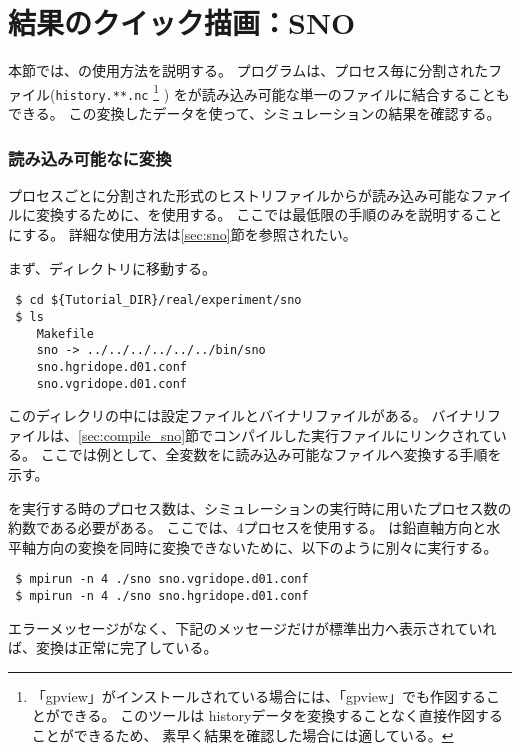 \section{結果のクイック描画：SNO} \label{sec:quicklook}

本節では、\sno の使用方法を説明する。
プログラム\sno は、プロセス毎に分割された{\netcdf}ファイル(\verb|history.**.nc|
\footnote{「gpview」がインストールされている場合には、「gpview」でも作図することができる。
このツールは historyデータを変換することなく直接作図することができるため、
素早く結果を確認した場合には適している。
}
)
を{\grads}が読み込み可能な単一の{\netcdf}ファイルに結合することもできる。
この変換した{\netcdf}データを使って、シミュレーションの結果を確認する。


\subsubsection{{\grads}読み込み可能な{\netcdf}に変換}
プロセスごとに分割された{\netcdf}形式のヒストリファイルから{\grads}が読み込み可能な{\netcdf}ファイルに変換するために、\sno を使用する。
ここでは最低限の手順のみを説明することにする。
詳細な使用方法は\ref{sec:sno}節を参照されたい。

まず、\sno ディレクトリに移動する。
\begin{verbatim}
 $ cd ${Tutorial_DIR}/real/experiment/sno
 $ ls
    Makefile
    sno -> ../../../../../../bin/sno
    sno.hgridope.d01.conf
    sno.vgridope.d01.conf
\end{verbatim}
このディレクリの中には設定ファイルとバイナリファイルがある。
バイナリファイルは、\ref{sec:compile_sno}節でコンパイルした実行ファイルにリンクされている。
ここでは例として、全変数を{\grads}に読み込み可能な{\netcdf}ファイルへ変換する手順を示す。

\sno を実行する時のプロセス数は、シミュレーションの実行時に用いたプロセス数の約数である必要がある。
ここでは、4プロセスを使用する。
\sno は鉛直軸方向と水平軸方向の変換を同時に変換できないために、以下のように別々に実行する。
\begin{verbatim}
 $ mpirun -n 4 ./sno sno.vgridope.d01.conf
 $ mpirun -n 4 ./sno sno.hgridope.d01.conf
\end{verbatim}
エラーメッセージがなく、下記のメッセージだけが標準出力へ表示されていれば、変換は正常に完了している。

